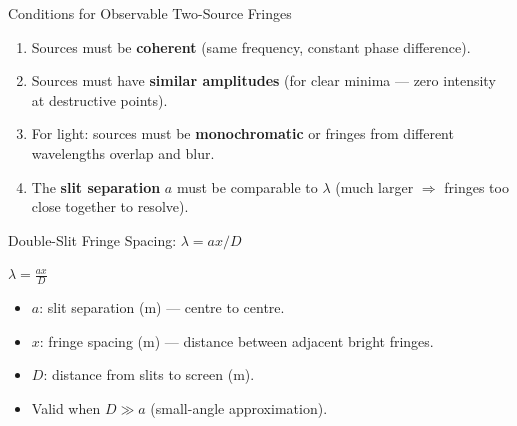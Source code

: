 \begin{keybox}{Conditions for Observable Two-Source Fringes}
\begin{enumerate}[itemsep=2pt]
  \item Sources must be \textbf{coherent} (same frequency, constant phase difference).
  \item Sources must have \textbf{similar amplitudes} (for clear minima — zero intensity at destructive points).
  \item For light: sources must be \textbf{monochromatic} or fringes from different wavelengths overlap and blur.
  \item The \textbf{slit separation} $a$ must be comparable to $\lambda$ (much larger $\Rightarrow$ fringes too close together to resolve).
\end{enumerate}
\end{keybox}

\begin{formulabox}{Double-Slit Fringe Spacing: \texorpdfstring{$\lambda = ax/D$}{lambda = ax/D}}
\begin{center}
\Large $\lambda = \frac{ax}{D}$
\end{center}
\vspace{0.3em}
\begin{itemize}[itemsep=2pt]
  \item $a$: slit separation (m) — centre to centre.
  \item $x$: fringe spacing (m) — distance between adjacent bright fringes.
  \item $D$: distance from slits to screen (m).
  \item Valid when $D \gg a$ (small-angle approximation).
\end{itemize}
\end{formulabox}



\vspace{2cm}

\renewcommand\rightAngle[4]{
  \pgfmathanglebetweenpoints{\pgfpointanchor{#2}{center}}{\pgfpointanchor{#3}{center}}
  \coordinate (tmpRA) at ($(#2)+(\pgfmathresult+45:#4)$);
  \draw[white,line width=0.6] ($(#2)!(tmpRA)!(#1)$) -- (tmpRA) -- ($(#2)!(tmpRA)!(#3)$);
  \draw[mydarkred] ($(#2)!(tmpRA)!(#1)$) -- (tmpRA) -- ($(#2)!(tmpRA)!(#3)$);
}
\providecommand\lineend[2]{
  \def\w{0.1} \def\c{30}
  \draw[mygreen] (#1)++(#2:\w) to[out=#2-180-\c,in=#2+\c] (#1)
                               to[out=#2+\c-180,in=#2-\c]++ (#2-180:\w);
}
\def\tick#1#2{\draw[thick] (#1) ++ (#2:0.1) --++ (#2-180:0.2)}





